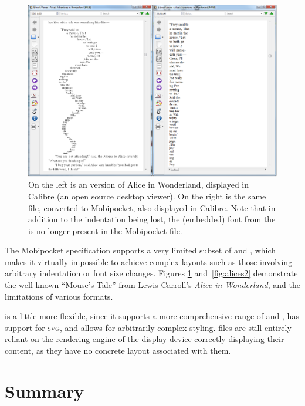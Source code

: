 \begin{figure}
\includegraphics[width=\textwidth]{gfx/alices1}
\caption[Document displayed in Calibre]{On the left is an \epub{} version of Alice in Wonderland, displayed in Calibre (an open source desktop \ebook{} viewer). On the right is the same file, converted to Mobipocket, also displayed in Calibre. Note that in addition to the indentation being lost, the (embedded) font from the \epub{} is no longer present in the Mobipocket file.}
\label{fig:alices1}
\end{figure}



The Mobipocket specification supports a very limited subset of \html{} and \css{}, which makes it virtually impossible to achieve complex layouts such as those involving arbitrary indentation or font size changes. Figures \ref{fig:alices1} and~\ref{fig:alices2} demonstrate the well known ``Mouse's Tale'' from Lewis Carroll's \emph{Alice in Wonderland}, and the limitations of various formats.


\epub{} is a little more flexible, since it supports a more comprehensive range of \xhtml{} and \css{}, has support for \textsc{svg}, and allows for arbitrarily complex styling. \epub{} files are still entirely reliant on the rendering engine of the display device correctly displaying their content, as they have no concrete layout associated with them.





\section{Summary}

